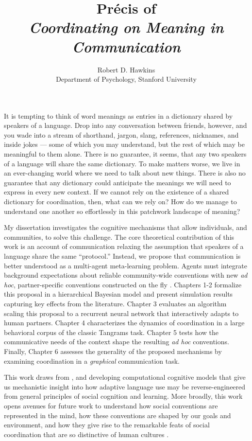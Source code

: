 \documentclass[11pt]{article}
\title{Pr\'ecis of \\ \emph{Coordinating on Meaning in Communication} }
\author{Robert D. Hawkins \\ \small Department of Psychology, Stanford University}
\date{}
\begin{document}

\maketitle

It is tempting to think of word meanings as entries in a dictionary shared by speakers of a language. 
Drop into any conversation between friends, however, and you wade into a stream of shorthand, jargon, slang, references, nicknames, and inside jokes --- some of which you may understand, but the rest of which may be meaningful to them alone. 
There is no guarantee, it seems, that any two speakers of a language will share the same dictionary.
To make matters worse, we live in an ever-changing world where we need to talk about new things.
There is also no guarantee that any dictionary could anticipate the meanings we will need to express in every new context.
If we cannot rely on the existence of a shared dictionary for coordination, then, what can we rely on?
How do we manage to understand one another so effortlessly in this patchwork landscape of meaning?

My dissertation investigates the cognitive mechanisms that allow individuals, and communities, to solve this challenge.
The core theoretical contribution of this work is an account of communication relaxing the assumption that speakers of a language share the same ``protocol.''
Instead, we propose that communication is better understood as a multi-agent meta-learning problem.
Agents must integrate background expectations about reliable community-wide conventions \cite{Lewis69_Convention} with new \emph{ad hoc}, partner-specific conventions constructed on the fly \cite{clark_using_1996,davidson_nice_1986}.
Chapters 1-2 formalize this proposal in a hierarchical Bayesian model and present simulation results capturing key effects from the literature. 
Chapter 3 evaluates an algorithm scaling this proposal to a recurrent neural network that interactively adapts to human partners.
Chapter 4 characterizes the dynamics of coordination in a large behavioral corpus of the classic Tangrams task. 
Chapter 5 tests how the communicative needs of the context shape the resulting \emph{ad hoc} conventions. 
Finally, Chapter 6 assesses the generality of the proposed mechanisms by examining coordination in a \emph{graphical} communication task. 

This work draws from , and developing computational cognitive models that give us mechanistic insight into how adaptive language use may be reverse-engineered from general principles of social cognition and learning. 
More broadly, this work opens avenues for future work to understand how social conventions are represented in the mind, how these conventions are shaped by our goals and environment, and how they give rise to the remarkable feats of social coordination that are so distinctive of human cultures \cite{hawkins2019emergence}.
\end{document}
